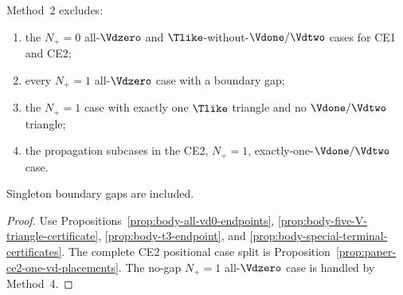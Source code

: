 \begin{proposition}
\label{prop:body-demand-branches}
Method~2 excludes:
\begin{enumerate}
\item the $N_+=0$ all-$\Vdzero$ and
$\Tlike$-without-$\Vdone/\Vdtwo$ cases for CE1 and CE2;
\item every $N_+=1$ all-$\Vdzero$ case with a boundary gap;
\item the $N_+=1$ case with exactly one $\Tlike$ triangle and no
$\Vdone/\Vdtwo$ triangle;
\item the propagation subcases in the CE2, $N_+=1$,
exactly-one-$\Vdone/\Vdtwo$ case.
\end{enumerate}
Singleton boundary gaps are included.
\end{proposition}

\begin{proof}
Use Propositions~\ref{prop:body-all-vd0-endpoints},
\ref{prop:body-five-V-triangle-certificate},
\ref{prop:body-t3-endpoint}, and
\ref{prop:body-special-terminal-certificates}.  The complete CE2 positional
case split is Proposition~\ref{prop:paper-ce2-one-vd-placements}.  The no-gap
$N_+=1$ all-$\Vdzero$ case is handled by Method~4.
\end{proof}
